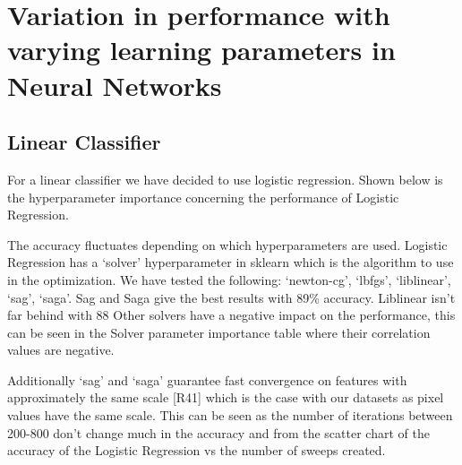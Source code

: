 \documentclass[11pt]{article}
\begin{document}
\newpage
\section{Variation in performance with varying learning parameters in Neural Networks}
\subsection{Linear Classifier}

For a linear classifier we have decided to use logistic regression. 
Shown below is the hyperparameter importance concerning the performance of Logistic Regression.

The accuracy fluctuates depending on which hyperparameters are used. Logistic Regression has a ‘solver’ hyperparameter in sklearn which is the algorithm to use in the optimization. We have tested the following: ‘newton-cg’, ‘lbfgs’, ‘liblinear’, ‘sag’, ‘saga’. Sag and Saga give the best results with 89\% accuracy. Liblinear isn't far behind with 88%
Other solvers have a negative impact on the performance, this can be seen in the Solver parameter importance table where their correlation values are negative.

Additionally ‘sag’ and ‘saga’ guarantee fast convergence on features with approximately the same scale [R41] which is the case with our datasets as pixel values have the same scale. This can be seen as the number of iterations between 200-800 don’t change much in the accuracy and from the scatter chart of the accuracy of the Logistic Regression vs the number of sweeps created.
\end{document}
